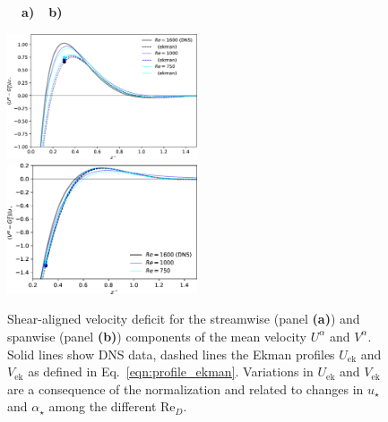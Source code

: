\documentclass[smallcondensed,final]{svjour3}
\newcommand{\RE}{\mathrm{Re}}
\begin{document}
\begin{figure}
  \begin{flushleft}
    \textbf{\ \ a)}\hspace{0.45\textwidth}\textbf{\ \ b)}\\
  \end{flushleft} 
  \includegraphics[width=0.5\textwidth]{Fig6a.eps} %
  \includegraphics[width=0.5\textwidth]{Fig6b.eps} %
  \caption{
    \label{fig:profiles_outer}
    Shear-aligned velocity deficit for the streamwise (panel \textbf{(a)}) and spanwise (panel \textbf{(b)})
    components of the mean velocity $U^\alpha$ and $V^\alpha$.
    Solid lines show DNS data, dashed lines the Ekman profiles $U_\mathrm{ek}$ and $V_\mathrm{ek}$ as defined in
    Eq.~\ref{eqn:profile_ekman}. 
    Variations in $U_\mathrm{ek}$ and $V_\mathrm{ek}$ are
    a consequence of the normalization and related to changes in $u_\star$ and $\alpha_\star$ among the different $\RE_D$. 
  }
\end{figure}
\end{document}
